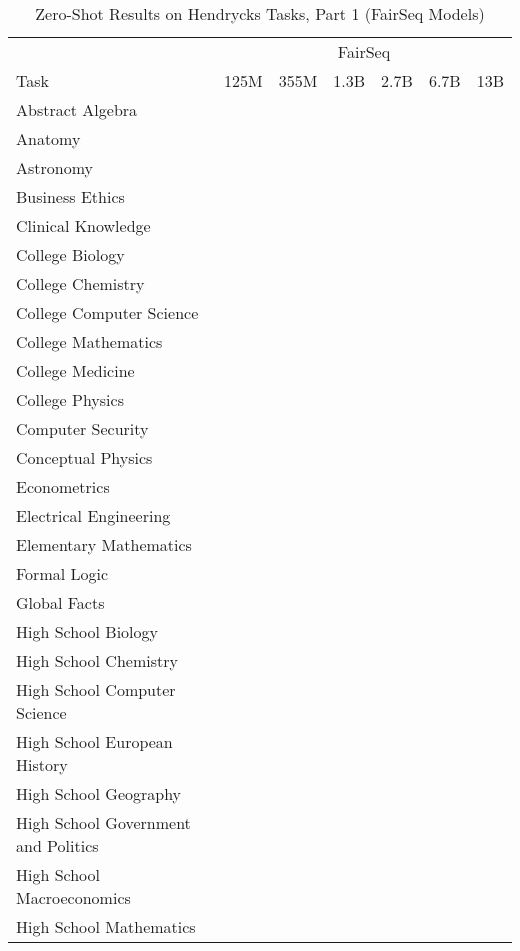 \documentclass[11pt]{article}
\begin{document}
{\begin{landscape}
\begin{table*}    
\centering \begin{tabular}{l c c c c c c }
 & \multicolumn{6}{c}{FairSeq} \\
Task & 125M & 355M & 1.3B & 2.7B & 6.7B & 13B\\ \toprule
Abstract Algebra &  &  &  &  &  &  \\ 
Anatomy &  &  &  &  &  &  \\ 
Astronomy &  &  &  &  &  &  \\ 
Business Ethics &  &  &  &  &  &  \\ 
Clinical Knowledge &  &  &  &  &  &  \\ 
College Biology &  &  &  &  &  &  \\ 
College Chemistry &  &  &  &  &  &  \\ 
College Computer Science &  &  &  &  &  &  \\ 
College Mathematics &  &  &  &  &  &  \\ 
College Medicine &  &  &  &  &  &  \\ 
College Physics &  &  &  &  &  &  \\ 
Computer Security &  &  &  &  &  &  \\ 
Conceptual Physics &  &  &  &  &  &  \\ 
Econometrics &  &  &  &  &  &  \\ 
Electrical Engineering &  &  &  &  &  &  \\ 
Elementary Mathematics &  &  &  &  &  &  \\ 
Formal Logic &  &  &  &  &  &  \\ 
Global Facts &  &  &  &  &  &  \\ 
High School Biology &  &  &  &  &  &  \\ 
High School Chemistry &  &  &  &  &  &  \\ 
High School Computer Science &  &  &  &  &  &  \\ 
High School European History &  &  &  &  &  &  \\ 
High School Geography &  &  &  &  &  &  \\ 
High School Government and Politics &  &  &  &  &  &  \\ 
High School Macroeconomics &  &  &  &  &  &  \\ 
High School Mathematics &  &  &  &  &  &  \\ 
\bottomrule
\end{tabular}
\caption{Zero-Shot Results on Hendrycks Tasks, Part 1 (FairSeq Models)}
\label{tab:hendrycks-fair1}
\end{table*}


\end{landscape}}
\end{document}
